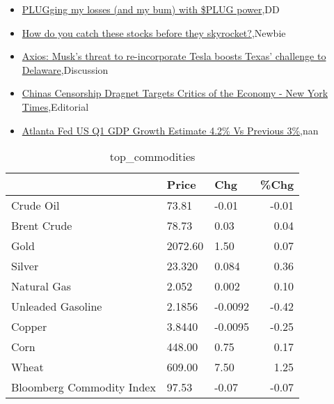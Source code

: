 \documentclass{article}%
\begin{document}
%
\begin{itemize}%
\item%
\href{https://reddit.com/r/wallstreetbets/comments/1ah1zkv/plugging\_my\_losses\_and\_my\_bum\_with\_plug\_power/}{PLUGging my losses (and my bum) with \$PLUG power},DD%
\item%
\href{https://reddit.com/r/StockMarket/comments/1agp56e/how\_do\_you\_catch\_these\_stocks\_before\_they/}{How do you catch these stocks before they skyrocket?},Newbie%
\item%
\href{https://reddit.com/r/StockMarket/comments/1agldee/axios\_musks\_threat\_to\_reincorporate\_tesla\_boosts/}{Axios: Musk's threat to re-incorporate Tesla boosts Texas' challenge to Delaware},Discussion%
\item%
\href{https://reddit.com/r/Economics/comments/1agppts/chinas\_censorship\_dragnet\_targets\_critics\_of\_the/}{Chinas Censorship Dragnet Targets Critics of the Economy - New York Times},Editorial%
\item%
\href{https://reddit.com/r/Economics/comments/1aglrsi/atlanta\_fed\_us\_q1\_gdp\_growth\_estimate\_42\_vs/}{Atlanta Fed US Q1 GDP Growth Estimate 4.2\% Vs Previous 3\%},nan%
\end{itemize}%


\begin{table}[htbp]%
\caption{top\_commodities}%
\centering%
\begin{adjustbox}{width=1\textwidth}%
\begin{tabular}{lllr}
\toprule
                          &   Price &     Chg &  \%Chg \\
\midrule
               Crude Oil  &   73.81 &   -0.01 & -0.01 \\
             Brent Crude  &   78.73 &    0.03 &  0.04 \\
                    Gold  & 2072.60 &    1.50 &  0.07 \\
                  Silver  &  23.320 &   0.084 &  0.36 \\
             Natural Gas  &   2.052 &   0.002 &  0.10 \\
       Unleaded Gasoline  &  2.1856 & -0.0092 & -0.42 \\
                  Copper  &  3.8440 & -0.0095 & -0.25 \\
                    Corn  &  448.00 &    0.75 &  0.17 \\
                   Wheat  &  609.00 &    7.50 &  1.25 \\
Bloomberg Commodity Index &   97.53 &   -0.07 & -0.07 \\
\bottomrule
\end{tabular}
%
\end{adjustbox}%
\end{table}
\end{document}
